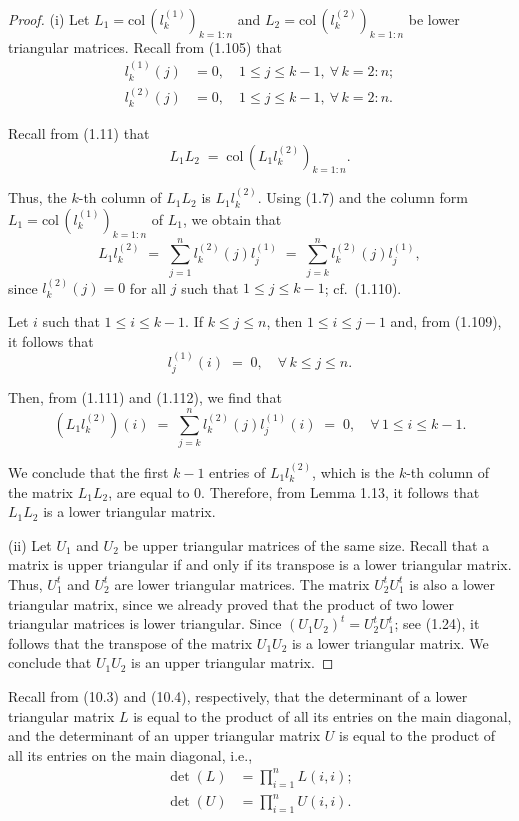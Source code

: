 \begin{proof}
(i) Let $L_1=\mathrm{col}\,\!\left(l_k^{(1)}\right)_{k=1:n}$ and
$L_2=\mathrm{col}\,\!\left(l_k^{(2)}\right)_{k=1:n}$ be lower triangular
matrices. Recall from (1.105) that
\begin{align}
l_k^{(1)}(j) &= 0, \quad 1\le j\le k-1,\ \forall\, k=2:n; \\
l_k^{(2)}(j) &= 0, \quad 1\le j\le k-1,\ \forall\, k=2:n.
\end{align}

Recall from (1.11) that
\[
L_1L_2 \;=\; \mathrm{col}\,\!\left(L_1l_k^{(2)}\right)_{k=1:n}.
\]

Thus, the $k$-th column of $L_1L_2$ is $L_1l_k^{(2)}$. Using (1.7) and
the column form $L_1=\mathrm{col}\,\!\left(l_k^{(1)}\right)_{k=1:n}$ of
$L_1$, we obtain that
\begin{equation}
L_1l_k^{(2)} \;=\; \sum_{j=1}^n l_k^{(2)}(j)l_j^{(1)} \;=\; \sum_{j=k}^n l_k^{(2)}(j)l_j^{(1)},
\end{equation}
since $l_k^{(2)}(j)=0$ for all $j$ such that $1\le j\le k-1$; cf.\ (1.110).

Let $i$ such that $1\le i\le k-1$. If $k\le j\le n$, then $1\le i\le j-1$
and, from (1.109), it follows that
\begin{equation}
l_j^{(1)}(i) \;=\; 0, \quad \forall\, k\le j\le n.
\end{equation}

Then, from (1.111) and (1.112), we find that
\[
\left(L_1l_k^{(2)}\right)(i) \;=\; \sum_{j=k}^n l_k^{(2)}(j)l_j^{(1)}(i) \;=\; 0, \quad \forall\, 1\le i\le k-1.
\]

We conclude that the first $k-1$ entries of $L_1l_k^{(2)}$, which is the
$k$-th column of the matrix $L_1L_2$, are equal to $0$. Therefore, from
Lemma 1.13, it follows that $L_1L_2$ is a lower triangular matrix.

(ii) Let $U_1$ and $U_2$ be upper triangular matrices of the same size.
Recall that a matrix is upper triangular if and only if its transpose is
a lower triangular matrix. Thus, $U_1^t$ and $U_2^t$ are lower triangular
matrices. The matrix $U_2^tU_1^t$ is also a lower triangular matrix,
since we already proved that the product of two lower triangular
matrices is lower triangular. Since $(U_1U_2)^t=U_2^tU_1^t$; see (1.24),
it follows that the transpose of the matrix $U_1U_2$ is a lower
triangular matrix. We conclude that $U_1U_2$ is an upper triangular
matrix.
\end{proof}

Recall from (10.3) and (10.4), respectively, that the determinant of a
lower triangular matrix $L$ is equal to the product of all its entries on
the main diagonal, and the determinant of an upper triangular matrix $U$
is equal to the product of all its entries on the main diagonal, i.e.,
\begin{align}
\det(L) &= \prod_{i=1}^n L(i,i); \\
\det(U) &= \prod_{i=1}^n U(i,i).
\end{align}

